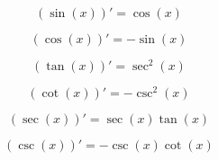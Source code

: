 \begin{multicols}{2}
\begin{proposition}
    $$
        (\sin(x))' = \cos(x)
    $$
\end{proposition}

\begin{proposition}
    $$
        (\cos(x))' = -\sin(x)
    $$
\end{proposition}

\begin{proposition}
    $$
        (\tan(x))' = \sec^2(x)
    $$
\end{proposition}

\begin{proposition}
    $$
        (\cot(x))' = -\csc^2(x)
    $$
\end{proposition}

\begin{proposition}
    $$
        (\sec(x))' = \sec(x) \tan(x)
    $$
\end{proposition}

\begin{proposition}
    $$
        (\csc(x))' = -\csc(x) \cot(x)
    $$
\end{proposition}

\end{multicols}
